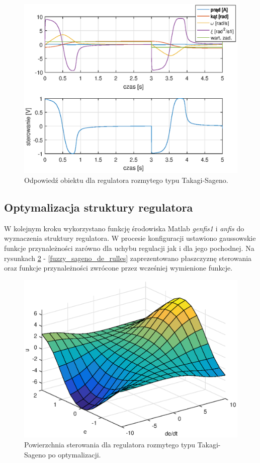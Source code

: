 \begin{figure}[h!]
	\centering
	\includegraphics[scale = 0.8]{fig/fuzzy_sagenoMan_odp.eps}
	\caption		
	{Odpowied\'z obiektu dla regulatora rozmytego typu Takagi-Sageno.}
	\label{fuzzy_sageno_man}
\end{figure}
\FloatBarrier
\newpage

\subsection{Optymalizacja struktury regulatora}
W kolejnym kroku wykorzystano funkcję środowiska Matlab \textit{genfis1} i \textit{anfis} do wyznaczenia struktury regulatora. W procesie konfiguracji ustawiono gaussowskie funkcje przynależności zarówno dla uchybu regulacji jak i dla jego pochodnej. Na rysunkach \ref{fuzzy_sageno_sufrace} - \ref{fuzzy_sageno_de_rulles} zaprezentowano płaszczyznę sterowania oraz funkcje przynależności zwrócone przez wcześniej wymienione funkcje.
\begin{figure}[h!]
	\centering
	\includegraphics[scale = 0.8]{fig/sagenoOptSurface.eps}
	\caption		
	{Powierzchnia sterowania dla regulatora rozmytego typu Takagi-Sageno po optymalizacji.}
	\label{fuzzy_sageno_sufrace}
\end{figure}

